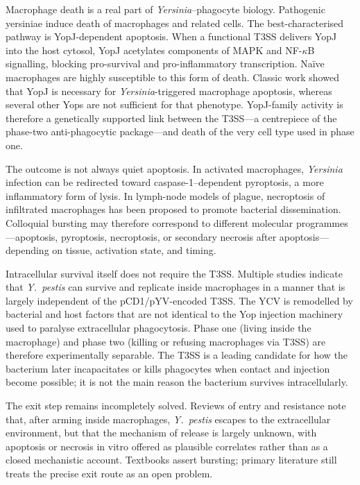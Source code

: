 \documentclass[11pt,a4paper]{article}
\begin{document}
Macrophage death is a real part of \textit{Yersinia}--phagocyte biology. Pathogenic yersiniae induce death of macrophages and related cells. The best-characterised pathway is YopJ-dependent apoptosis. When a functional T3SS delivers YopJ into the host cytosol, YopJ acetylates components of MAPK and NF-$\kappa$B signalling, blocking pro-survival and pro-inflammatory transcription. Na\"ive macrophages are highly susceptible to this form of death. Classic work showed that YopJ is necessary for \textit{Yersinia}-triggered macrophage apoptosis, whereas several other Yops are not sufficient for that phenotype. YopJ-family activity is therefore a genetically supported link between the T3SS---a centrepiece of the phase-two anti-phagocytic package---and death of the very cell type used in phase one.

The outcome is not always quiet apoptosis. In activated macrophages, \textit{Yersinia} infection can be redirected toward caspase-1--dependent pyroptosis, a more inflammatory form of lysis. In lymph-node models of plague, necroptosis of infiltrated macrophages has been proposed to promote bacterial dissemination. Colloquial bursting may therefore correspond to different molecular programmes---apoptosis, pyroptosis, necroptosis, or secondary necrosis after apoptosis---depending on tissue, activation state, and timing.

Intracellular survival itself does not require the T3SS. Multiple studies indicate that \textit{Y.\ pestis} can survive and replicate inside macrophages in a manner that is largely independent of the pCD1/pYV-encoded T3SS. The YCV is remodelled by bacterial and host factors that are not identical to the Yop injection machinery used to paralyse extracellular phagocytosis. Phase one (living inside the macrophage) and phase two (killing or refusing macrophages via T3SS) are therefore experimentally separable. The T3SS is a leading candidate for how the bacterium later incapacitates or kills phagocytes when contact and injection become possible; it is not the main reason the bacterium survives intracellularly.

The exit step remains incompletely solved. Reviews of entry and resistance note that, after arming inside macrophages, \textit{Y.\ pestis} escapes to the extracellular environment, but that the mechanism of release is largely unknown, with apoptosis or necrosis in vitro offered as plausible correlates rather than as a closed mechanistic account. Textbooks assert bursting; primary literature still treats the precise exit route as an open problem.
\end{document}
